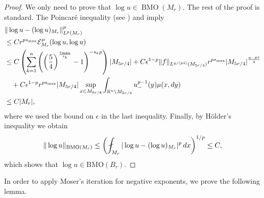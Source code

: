 \documentclass[11pt]{amsart}
\theoremstyle{plain}
\theoremstyle{definition}
\numberwithin{equation}{section}
\renewcommand{\d}{\textnormal{d}}
\DeclareMathOperator*{\BMO}{BMO}
\begin{document}
\begin{proof}
We only need to prove that $\log u \in \BMO(M_r)$. The rest of the proof is standard.
The Poincar\'e inequality (see ) and  imply
\begin{equation*}
\begin{split}
&\| \log u - (\log u)_{M_r} \|_{L^p(M_r)}^p \\
&\leq C r^{ps_{\max}} \mathcal{E}^\mu_{M_r} (\log u, \log u) \\
&\leq C \left( \sum_{k=1}^n \left( \left(\frac{5}{4}\right)^{\frac{s_{\max}}{s_k}}-1 \right)^{-s_k p} \right) |M_{5r/4}| + C\epsilon^{1-p} \|f\|_{L^{q/(p\bar{s})}(M_{5r/4})} r^{ps_{\max}} |M_{5r/4}|^{\frac{q-p\bar{s}}{q}} \\
&\quad + C\epsilon^{1-p} r^{ps_{\max}} |M_{5r/4}| \sup_{x \in M_{9r/8}} \int_{\mathbb{R}^n \setminus M_{5r/4}} u_-^{p-1}(y) \mu(x, \d y) \\
&\leq C|M_r|,
\end{split}
\end{equation*}
where we used the bound on $\epsilon$ in the last inequality.
Finally, by H\"older's inequality we obtain
\begin{equation*}
\|\log u\|_{\mathrm{BMO}(M_r)} \leq \left( \fint_{M_r} |\log u - (\log u)_{M_r}|^p \,\d x \right)^{1/p} \leq C,
\end{equation*}
which shows that $\log u \in \mathrm{BMO}(B_r)$. 
\end{proof}

In order to apply Moser's iteration for negative exponents, we prove the following lemma.
\end{document}
